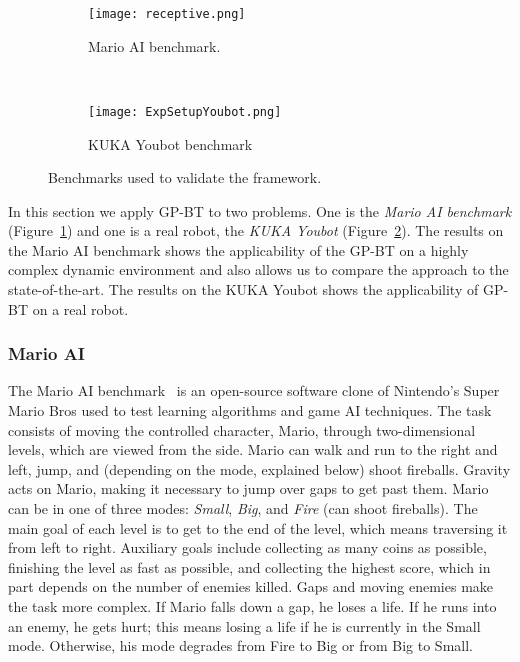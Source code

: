 \begin{figure}[t]
        \centering
        \begin{subfigure}[b]{0.5\columnwidth}
                \centering
                \texttt{[image: receptive.png]}
                \caption{Mario AI benchmark. }
                \label{res.fig.mario}
        \end{subfigure}%
       ~ %
        \begin{subfigure}[b]{0.5\columnwidth}
                \centering
                \texttt{[image: ExpSetupYoubot.png]}
                \caption{KUKA Youbot benchmark}
                \label{res.fig.youbot}              
        \end{subfigure}
        \caption{Benchmarks used to validate the framework.}
         \label{res.fig}        
\end{figure}


In this section we apply GP-BT to two problems. One is the \emph{Mario AI benchmark}  (Figure~\ref{res.fig.mario}) and one is  a real robot, the \emph{KUKA Youbot} (Figure~\ref{res.fig.youbot}). The results on the Mario AI benchmark shows the applicability of the GP-BT on a highly complex dynamic environment and
also allows us to compare the approach to the state-of-the-art. The results on the KUKA Youbot shows the applicability of GP-BT on a real robot.  

\subsubsection{Mario AI}
The Mario AI benchmark~\cite{karakovskiy2012mario} is an open-source software clone of Nintendo's Super Mario Bros used to test learning algorithms and game AI techniques. The task consists of moving the controlled character, Mario, through two-dimensional levels, which are viewed from the side. {Mario can walk and run to the right and left, jump, and (depending on the mode, explained below) shoot fireballs. Gravity acts on Mario, making it necessary to jump over gaps to get past them. Mario can be in one of three modes: \emph{Small}, \emph{Big}, and \emph{Fire} (can shoot fireballs).
The main goal of each level is to get to the end of the level, which means traversing it from left to right. Auxiliary goals include collecting as many coins as possible, finishing the level as fast as possible, and collecting the highest score, which in part depends on the number of enemies killed.
Gaps and moving enemies make the task more complex. If Mario falls down a gap, he loses a life. If he runs into an enemy, he gets hurt; this means losing a life if he is currently in the Small mode. Otherwise, his mode degrades from Fire to Big or from Big to Small. }

